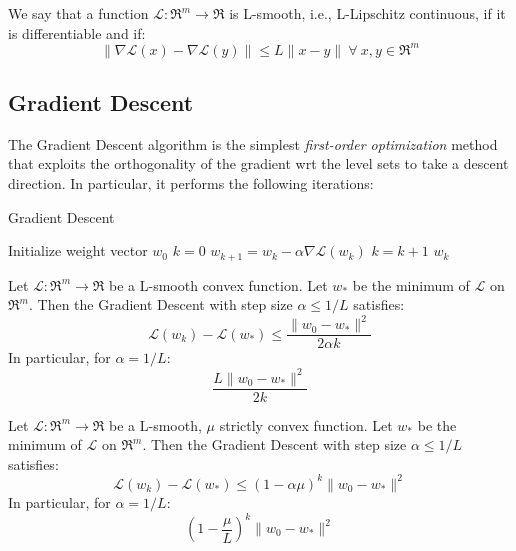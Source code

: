 \begin{definition}[L-smoothness] \label{def:l_smoothness}
We say that a function $\mathcal{L}: \Re^m \rightarrow \Re$ is L-smooth, i.e., L-Lipschitz continuous, if it is differentiable and if:
$$
\| \nabla \mathcal{L}(x) - \nabla \mathcal{L}(y) \| \leq L \| x - y \| \ \forall \ x, y \in \Re^m
$$
\end{definition}

\subsection{Gradient Descent}

The Gradient Descent algorithm is the simplest \emph{first-order optimization} method that exploits the orthogonality of the gradient wrt the level sets to take a descent direction. In particular, it performs the following iterations:

\begin{algorithm}[H]
	\caption{Gradient Descent}
	\label{alg:gd}
	\begin{algorithmic}
			\State Initialize weight vector $w_0$
			\State $k = 0$
				\State $w_{k+1} = w_k - \alpha \nabla \mathcal{L}(w_k)$
				\State $k = k + 1$
			\EndWhile
			\State \Return $w_k$
		\EndFunction
	\end{algorithmic}
\end{algorithm}

\begin{theorem} \label{thm:cvx_gd_convergence}
Let $\mathcal{L}: \Re^m \rightarrow \Re$ be a L-smooth convex function. Let $w_*$ be the minimum of $\mathcal{L}$ on $\Re^m$. Then the Gradient Descent with step size $\alpha \leq 1/L$ satisfies:
$$
\mathcal{L}(w_k) - \mathcal{L}(w_*) \leq \frac{\| w_0 - w_* \|^2}{2 \alpha k}
$$
In particular, for $\alpha = 1/L$:
$$
\frac{L \| w_0 - w_* \|^2}{2 k}
$$
\end{theorem}

\begin{theorem} \label{thm:str_cvx_convergence}
Let $\mathcal{L}: \Re^m \rightarrow \Re$ be a L-smooth, $\mu$ strictly convex function. Let $w_*$ be the minimum of $\mathcal{L}$ on $\Re^m$. Then the Gradient Descent with step size $\alpha \leq 1/L$ satisfies:
$$
\mathcal{L}(w_k) - \mathcal{L}(w_*) \leq (1 - \alpha \mu)^k \| w_0 - w_* \|^2
$$
In particular, for $\alpha = 1/L$:
$$
(1 - \frac{\mu}{L})^k \| w_0 - w_* \|^2
$$
\end{theorem}

